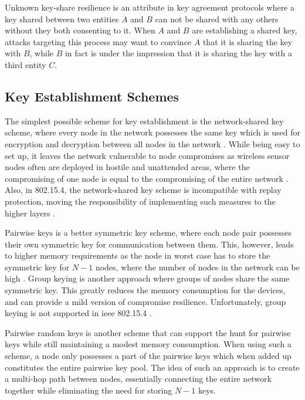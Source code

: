 Unknown key-share resilience is an attribute in key agreement protocols where a key shared between two entities $A$ and $B$ can not be shared with any others without they both consenting to it. When $A$ and $B$ are establishing a shared key, attacks targeting this process may want to convince $A$ that it is sharing the key with $B$, while $B$ in fact is under the impression that it is sharing the key with a third entity $C$. 


\subsection{Key Establishment Schemes}

The simplest possible scheme for key establishment is the network-shared key scheme, where every node in the network possesses the same key which is used for encryption and decryption between all nodes in the network \cite{perrig2004security}. While being easy to set up, it leaves the network vulnerable to node compromises as wireless sensor nodes often are deployed in hostile and unattended areas, where the compromising of one node is equal to the compromising of the entire network \cite{krentz20136lowpan}. Also, in 802.15.4, the network-shared key scheme is incompatible with replay protection, moving the responsibility of implementing such measures to the higher layers \cite{sastry2004security}.

Pairwise keys is a better symmetric key scheme, where each node pair possesses their own symmetric key for communication between them. This, however, leads to higher memory requirements as the node in worst case has to store the symmetric key for $N-1$ nodes, where the number of nodes in the network can be high \cite{perrig2004security}. Group keying is another approach where groups of nodes share the same symmetric key. This greatly reduces the memory consumption for the devices, and can provide a mild version of compromise resilience. Unfortunately, group keying is not supported in \gls{ieee} 802.15.4 \cite{sastry2004security}.

Pairwise random keys is another scheme that can support the hunt for pairwise keys while still maintaining a modest memory consumption. When using such a scheme, a node only possesses a part of the pairwise keys which when added up constitutes the entire pairwise key pool. The idea of such an approach is to create a multi-hop path between nodes, essentially connecting the entire network together while eliminating the need for storing $N-1$ keys.


